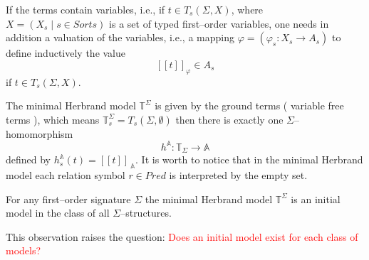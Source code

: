 \documentclass[landscape, autoslides, light]{mmiss}
\newcommand{\ns}{\normalsize}
\newcommand{\ekl}{[\![}
\newcommand{\ekr}{]\!]}
\begin{document}
\begin{Package}[Label={FSDPT}, Title={Formal Specification of Data and Process Types}, ShortTitle={FSDPT}, Authors={Horst Reichel}, Date={February 2003}, LevelOfDetail=Lecture, Language=en-GB]
\begin{Section}[Title={Initial Algebras as Data Types}, Label={section3}]
\begin{Section}[Title={Existence of initial models}, Label={section3_1}]
\begin{Paragraph}[Label=Paragraph25]

\end{Paragraph}
\begin{Paragraph}[Label=Paragraph26]
If the terms contain variables, i.e., if $ t \in T_s(\Sigma, X)$,
where $X = (X_s \; | \; s \in Sorts)$ is a set of typed
first--order variables, one needs in addition a valuation of the
variables, i.e., a mapping $\varphi = (\varphi_s : X_s \to A_s)$
to define inductively the value $$\ekl t \ekr_{\varphi} \in A_s$$
if $t \in T_s(\Sigma, X)$.


\end{Paragraph}
 \begin{Paragraph}[Title={Minimal Herbrand Model}, Label=Paragraph27]

 The minimal Herbrand model $\mathbb{T}^{\Sigma}$ is given by the
ground terms ( variable free terms ), which means
$\mathbb{T}^{\Sigma}_s = T_s(\Sigma, \emptyset)$ then there is
exactly one $\Sigma$--homomorphism
$$ h^{\mathbb A} : \mathbb{T}_{\Sigma} \to {\mathbb A}$$ defined
by $ h^{\mathbb A}_s(t) = \ekl t \ekr_{\:{\mathbb A}}$. It is
worth to notice that in the minimal Herbrand model each relation
symbol $r \in Pred$ is interpreted by the empty set. \ns


\end{Paragraph}
 \begin{Paragraph}[Title={Minimal Herbrand Model}, Label=Paragraph28]
\begin{Corollary}[Title = {Initial Algebras as Data Types}, Label = {Corollary1}]
For any first--order signature $\Sigma$ the minimal Herbrand model
$\mathbb{T}^{\Sigma}$ is an initial model in the class of all
$\Sigma$--structures. \end{Corollary}

\vspace{1.5cm}

This observation raises the question: \textcolor{red}{Does an
initial model exist for each class of models?}



\end{Paragraph}
\end{Section}
\end{Section}
\end{Package}
\end{document}
